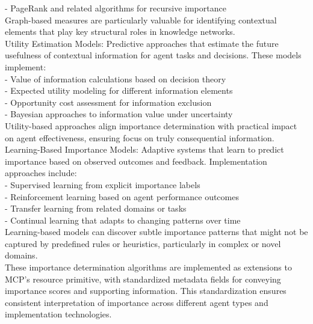 - PageRank and related algorithms for recursive importance\\ \newline
Graph-based measures are particularly valuable for identifying contextual elements that play key structural roles in knowledge networks.\\ \newline
Utility Estimation Models: Predictive approaches that estimate the future usefulness of contextual information for agent tasks and decisions. These models implement:\\ \newline
- Value of information calculations based on decision theory\\ \newline
- Expected utility modeling for different information elements\\ \newline
- Opportunity cost assessment for information exclusion\\ \newline
- Bayesian approaches to information value under uncertainty\\ \newline
Utility-based approaches align importance determination with practical impact on agent effectiveness, ensuring focus on truly consequential information.\\ \newline
Learning-Based Importance Models: Adaptive systems that learn to predict importance based on observed outcomes and feedback. Implementation approaches include:\\ \newline
- Supervised learning from explicit importance labels\\ \newline
- Reinforcement learning based on agent performance outcomes\\ \newline
- Transfer learning from related domains or tasks\\ \newline
- Continual learning that adapts to changing patterns over time\\ \newline
Learning-based models can discover subtle importance patterns that might not be captured by predefined rules or heuristics, particularly in complex or novel domains.\\ \newline
These importance determination algorithms are implemented as extensions to MCP's resource primitive, with standardized metadata fields for conveying importance scores and supporting information. This standardization ensures consistent interpretation of importance across different agent types and implementation technologies.\\

